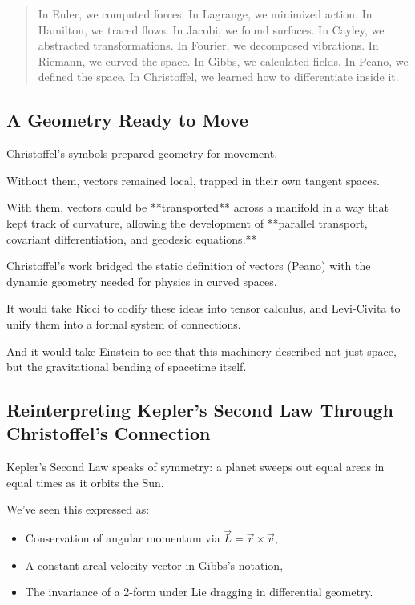 \bigskip

\begin{quote}
In Euler, we computed forces.  
In Lagrange, we minimized action.  
In Hamilton, we traced flows.  
In Jacobi, we found surfaces.  
In Cayley, we abstracted transformations.  
In Fourier, we decomposed vibrations.  
In Riemann, we curved the space.  
In Gibbs, we calculated fields.  
In Peano, we defined the space.  
In Christoffel, we learned how to differentiate inside it.
\end{quote}

\subsection*{A Geometry Ready to Move}

Christoffel’s symbols prepared geometry for movement.

Without them, vectors remained local, trapped in their own tangent spaces.

With them, vectors could be **transported** across a manifold in a way that kept track of curvature,  
allowing the development of **parallel transport, covariant differentiation, and geodesic equations.**

Christoffel’s work bridged the static definition of vectors (Peano)  
with the dynamic geometry needed for physics in curved spaces.

It would take Ricci to codify these ideas into tensor calculus,  
and Levi-Civita to unify them into a formal system of connections.

And it would take Einstein to see that this machinery described not just space,  
but the gravitational bending of spacetime itself.

\subsection*{Reinterpreting Kepler’s Second Law Through Christoffel’s Connection}

Kepler’s Second Law speaks of symmetry:  
a planet sweeps out equal areas in equal times as it orbits the Sun.

We’ve seen this expressed as:
\begin{itemize}
    \item Conservation of angular momentum via \( \vec{L} = \vec{r} \times \vec{v} \),
    \item A constant areal velocity vector in Gibbs’s notation,
    \item The invariance of a 2-form under Lie dragging in differential geometry.
\end{itemize}

